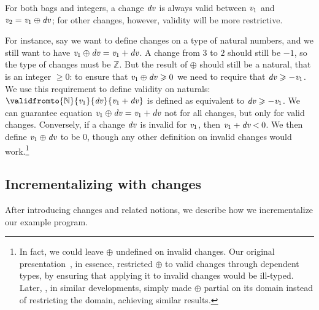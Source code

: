 For both bags and integers, a change \ensuremath{\Varid{dv}} is always valid between
\ensuremath{\Varid{v}_{1}} and \ensuremath{\Varid{v}_{2}\mathrel{=}\Varid{v}_{1}\oplus \Varid{dv}}; for other changes, however,
validity will be more restrictive.
\begin{example}
  \label{ex:invalid-nat}
For instance, say we want to
define changes on a type of natural numbers, and we still want to
have \ensuremath{\Varid{v}_{1}\oplus \Varid{dv}\mathrel{=}\Varid{v}_{1}\mathbin{+}\Varid{dv}}. A change from \ensuremath{\mathrm{3}} to \ensuremath{\mathrm{2}} should
still be \ensuremath{\mathbin{-}\mathrm{1}}, so the type of changes must be \ensuremath{\mathbb{Z}}. But the
result of \ensuremath{\oplus } should still be a natural, that is an integer
\ensuremath{\geq \mathrm{0}}: to ensure that \ensuremath{\Varid{v}_{1}\oplus \Varid{dv}\geq \mathrm{0}} we need to require
that \ensuremath{\Varid{dv}\geq \mathbin{-}\Varid{v}_{1}}. We use this requirement to define validity on
naturals: \ensuremath{\validfromto{\mathbb{N}}{\Varid{v}_{1}}{\Varid{dv}}{\Varid{v}_{1}\mathbin{+}\Varid{dv}}} is defined as equivalent to
\ensuremath{\Varid{dv}\geq \mathbin{-}\Varid{v}_{1}}. We can guarantee equation \ensuremath{\Varid{v}_{1}\oplus \Varid{dv}\mathrel{=}\Varid{v}_{1}\mathbin{+}\Varid{dv}}
not for all changes, but only for valid changes. Conversely, if a
change \ensuremath{\Varid{dv}} is invalid for \ensuremath{\Varid{v}_{1}}, then \ensuremath{\Varid{v}_{1}\mathbin{+}\Varid{dv}\mathbin{<}\mathrm{0}}. We then
define \ensuremath{\Varid{v}_{1}\oplus \Varid{dv}} to be \ensuremath{\mathrm{0}}, though any other definition on
invalid changes would work.\footnote{In fact, we could leave
  \ensuremath{\oplus } undefined on invalid changes. Our original
  presentation~\citep{CaiEtAl2014ILC}, in essence, restricted
  \ensuremath{\oplus } to valid changes through dependent types, by ensuring
  that applying it to invalid changes would be ill-typed. Later,
  \citet{Huesca2015incrementality}, in similar developments,
  simply made \ensuremath{\oplus } partial on its domain instead of
  restricting the domain, achieving similar results.}
\end{example}

\subsection{Incrementalizing with changes}
After introducing changes and related notions, we describe how we incrementalize
our example program.

